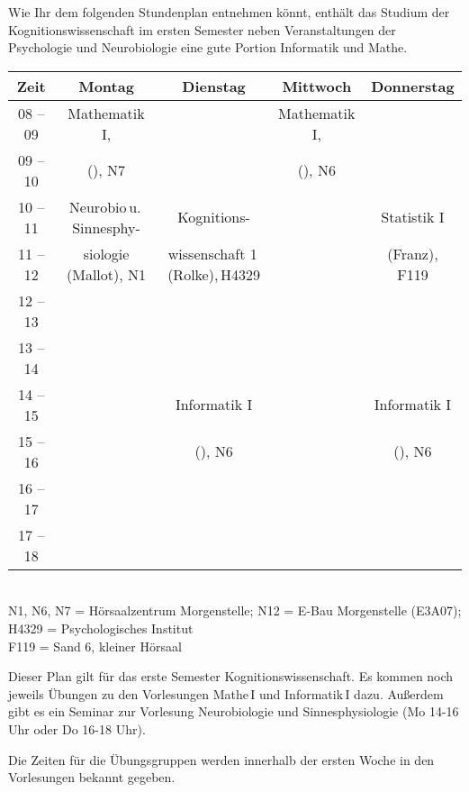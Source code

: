 Wie Ihr dem folgenden Stundenplan entnehmen könnt, enthält das Studium der Kognitionswissenschaft
im ersten Semester neben Veranstaltungen der Psychologie und Neurobiologie eine gute Portion Informatik und Mathe. 

\begin{center}
\small
\begin{tabular}{|c|c|c|c|c|} \hline
Zeit      & 			Montag 		& Dienstag							& Mittwoch 			& Donnerstag  \\
\hline\hline
08 -- 09  & 		Mathematik I, 	&									& Mathematik I, 	& \\
\cline{1-1}\cline{3-3}\cline{5-5}
09 -- 10  & 	(\Matheprof), N7	 & 									& (\Matheprof), N6 	&  \\
\cline{1-1}\cline{2-5}
10 -- 11 & Neurobio\,u.\,Sinnesphy- & Kognitions-						& 					& Statistik I \\
\cline{1-1}\cline{4-4}
11 -- 12 & siologie (Mallot), N1	& wissenschaft 1\,(Rolke),\,H4329	& 					& (Franz), F119 \\
\hline
12 -- 13 & & & & \\
\hline
13 -- 14 & & & & \\
\hline %
14 -- 15 &  						& Informatik I 						&					 & Informatik I  \\
\cline{1-2}\cline{4-4}
15 -- 16 &  						&  (\Infoprof), N6  				&					& (\Infoprof), N6  \\
\hline
16 -- 17 & & & &\\
\hline
17 -- 18 & & & & \\
\hline
\end{tabular}\\
\scriptsize  N1, N6, N7 = Hörsaalzentrum Morgenstelle; N12 = E-Bau Morgenstelle (E3A07); H4329 = Psychologisches Institut \\
F119 = Sand 6, kleiner Hörsaal
\end{center}

Dieser Plan gilt für das erste Semester Kognitionswissenschaft.
Es kommen noch jeweils Übungen zu den Vorlesungen Mathe\,I und Informatik\,I %
dazu.
Außerdem gibt es ein Seminar zur Vorlesung Neurobiologie und Sinnesphysiologie (Mo 14-16 Uhr oder Do 16-18 Uhr).

Die Zeiten für die Übungsgruppen werden innerhalb der ersten Woche in den Vorlesungen bekannt gegeben.
